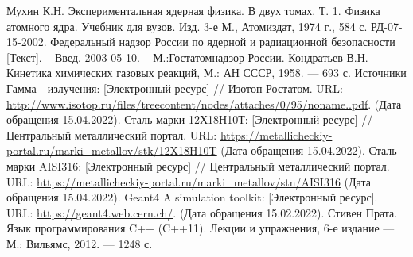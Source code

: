 \documentclass[14pt,a4paper,oneside]{article}
\begin{document}
\newpage
{}
\begin{thebibliography}{2}
Мухин К.Н. Экспериментальная ядерная физика. В двух томах. Т. 1. Физика атомного ядра. Учебник для вузов. Изд. 3-е М., Атомиздат, 1974 г., 584 с.
РД-07-15-2002. Федеральный надзор России по ядерной и радиационной безопасности [Текст]. -- Введ. 2003-05-10. -- М.:Гостатомнадзор России.
Кондратьев В.Н. Кинетика химических газовых реакций, М.: АН СССР, 1958. — 693 с.
Источники Гамма - излучения: [Электронный ресурс] // Изотоп Ростатом. URL:  \url{http://www.isotop.ru/files/treecontent/nodes/attaches/0/95/noname..pdf}. (Дата обращения 15.04.2022).
Сталь марки 12Х18Н10Т: [Электронный ресурс] // Центральный металлический портал. URL: \url{https://metallicheckiy-portal.ru/marki_metallov/stk/12X18H10T} (Дата обращения 15.04.2022).
Сталь марки AISI316: [Электронный ресурс] // Центральный металлический портал. URL: \url{https://metallicheckiy-portal.ru/marki_metallov/stn/AISI316} (Дата обращения 15.04.2022).
Geant4 A simulation toolkit: [Электронный ресурс]. URL:  \url{https://geant4.web.cern.ch/}. (Дата обращения 15.02.2022).
Стивен Прата. Язык программирования C++ (C++11). Лекции и упражнения, 6-е издание — М.: Вильямс, 2012. — 1248 с.
\end{thebibliography}
\end{document}
